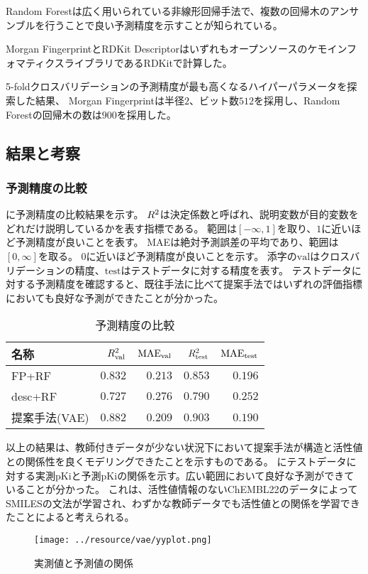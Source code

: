 Random Forest\cite{randomforest}は広く用いられている非線形回帰手法で、複数の回帰木のアンサンブルを行うことで良い予測精度を示すことが知られている。

Morgan FingerprintとRDKit DescriptorはいずれもオープンソースのケモインフォマティクスライブラリであるRDKit\cite{rdkit}で計算した。

5-foldクロスバリデーションの予測精度が最も高くなるハイパーパラメータを探索した結果、
Morgan Fingerprintは半径$2$、ビット数$512$を採用し、Random Forestの回帰木の数は$900$を採用した。

\subsection{結果と考察}

\subsubsection{予測精度の比較}

に予測精度の比較結果を示す。
$R^2$は決定係数と呼ばれ、説明変数が目的変数をどれだけ説明しているかを表す指標である。
範囲は$[-\infty, 1]$を取り、$1$に近いほど予測精度が良いことを表す。
MAEは絶対予測誤差の平均であり、範囲は$[0, \infty]$を取る。
$0$に近いほど予測精度が良いことを示す。
添字の$\mathrm{val}$はクロスバリデーションの精度、$\mathrm{test}$はテストデータに対する精度を表す。
テストデータに対する予測精度を確認すると、既往手法に比べて提案手法ではいずれの評価指標においても良好な予測ができたことが分かった。
\begin{table}[tbp]
\centering
\caption{予測精度の比較}
\label{tb:vae_prediction_result}
\begin{tabular}{lrrrr}\hline
名称 & $R^2_{\mathrm{val}}$ & $\mathrm{MAE}_{\mathrm{val}}$ & $R^2_{\mathrm{test}}$ & $\mathrm{MAE}_{\mathrm{test}}$ \\\hline
FP+RF & $0.832$& $0.213$& $0.853$& $0.196$\\
desc+RF & $0.727$& $0.276$& $0.790$& $0.252$\\
提案手法(VAE) & $0.882$& $0.209$& $0.903$& $0.190$\\\hline
\end{tabular}
\end{table}

以上の結果は、教師付きデータが少ない状況下において提案手法が構造と活性値との関係性を良くモデリングできたことを示すものである。
にテストデータに対する実測pKiと予測pKiの関係を示す。広い範囲において良好な予測ができていることが分かった。
これは、活性値情報のないChEMBL22のデータによってSMILESの文法が学習され、わずかな教師データでも活性値との関係を学習できたことによると考えられる。
\begin{figure}[tbp]
    \centering
    \texttt{[image: ../resource/vae/yyplot.png]}
    \caption{実測値と予測値の関係} \label{fig:vae_yyplot}
\end{figure}

